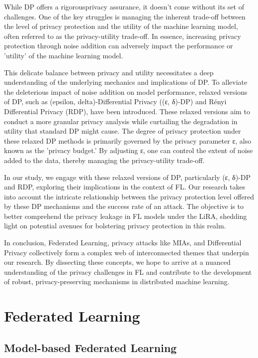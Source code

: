 While DP offers a rigorousprivacy assurance, it doesn't come without its set of challenges. One of the key struggles is managing the inherent trade-off between the level of privacy protection and the utility of the machine learning model, often referred to as the privacy-utility trade-off. In essence, increasing privacy protection through noise addition can adversely impact the performance or 'utility' of the machine learning model.

This delicate balance between privacy and utility necessitates a deep understanding of the underlying mechanics and implications of DP. To alleviate the deleterious impact of noise addition on model performance, relaxed versions of DP, such as (epsilon, delta)-Differential Privacy ((ε, δ)-DP) and Rényi Differential Privacy (RDP), have been introduced. These relaxed versions aim to conduct a more granular privacy analysis while curtailing the degradation in utility that standard DP might cause. The degree of privacy protection under these relaxed DP methods is primarily governed by the privacy parameter ε, also known as the 'privacy budget.' By adjusting ε, one can control the extent of noise added to the data, thereby managing the privacy-utility trade-off.

In our study, we engage with these relaxed versions of DP, particularly (ε, δ)-DP and RDP, exploring their implications in the context of FL. Our research takes into account the intricate relationship between the privacy protection level offered by these DP mechanisms and the success rate of an attack. The objective is to better comprehend the privacy leakage in FL models under the LiRA, shedding light on potential avenues for bolstering privacy protection in this realm.

In conclusion, Federated Learning, privacy attacks like MIAs, and Differential Privacy collectively form a complex web of interconnected themes that underpin our research. By dissecting these concepts, we hope to arrive at a nuanced understanding of the privacy challenges in FL and contribute to the development of robust, privacy-preserving mechanisms in distributed machine learning.


\section{Federated Learning}
\label{sec:fl}
\subsection{Model-based Federated Learning}
\label{sec:mbfl}

